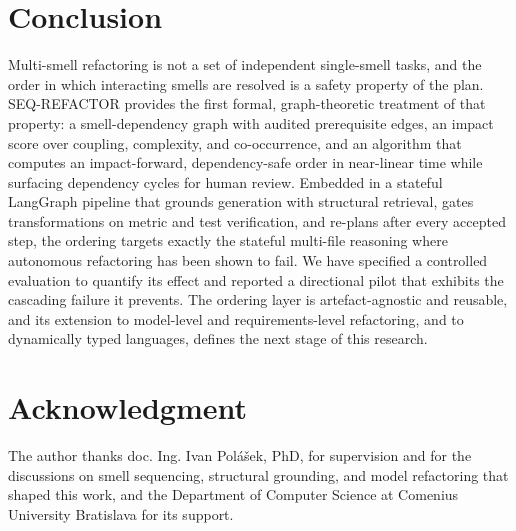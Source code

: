 \documentclass[journal,onecolumn,11pt]{IEEEtran}
\begin{document}
\section{Conclusion}
Multi-smell refactoring is not a set of independent single-smell tasks, and the order in which interacting smells are resolved is a safety property of the plan. SEQ-REFACTOR provides the first formal, graph-theoretic treatment of that property: a smell-dependency graph with audited prerequisite edges, an impact score over coupling, complexity, and co-occurrence, and an algorithm that computes an impact-forward, dependency-safe order in near-linear time while surfacing dependency cycles for human review. Embedded in a stateful LangGraph pipeline that grounds generation with structural retrieval, gates transformations on metric and test verification, and re-plans after every accepted step, the ordering targets exactly the stateful multi-file reasoning where autonomous refactoring has been shown to fail. We have specified a controlled evaluation to quantify its effect and reported a directional pilot that exhibits the cascading failure it prevents. The ordering layer is artefact-agnostic and reusable, and its extension to model-level and requirements-level refactoring, and to dynamically typed languages, defines the next stage of this research.

\section*{Acknowledgment}
The author thanks doc. Ing. Ivan Pol\'a\v{s}ek, PhD, for supervision and for the discussions on smell sequencing, structural grounding, and model refactoring that shaped this work, and the Department of Computer Science at Comenius University Bratislava for its support.
\end{document}
